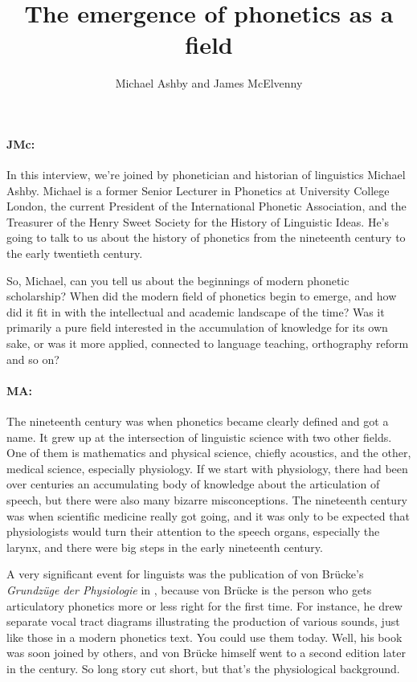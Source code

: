 \documentclass[output=paper]{langscibook}
\author{Michael Ashby\orcid{}\affiliation{University College London} and James McElvenny\affiliation{University of Siegen}}
\title{The emergence of phonetics as a field}
\begin{document}
\maketitle 

\paragraph*{JMc:} In this interview, we’re joined by phonetician and historian of linguistics Michael Ashby. Michael is a former Senior Lecturer in Phonetics at University College London, the current President of the International Phonetic Association, and the Treasurer of the Henry Sweet Society for the History of Linguistic Ideas. He’s going to talk to us about the history of phonetics from the nineteenth century to the early twentieth century.

So, Michael, can you tell us about the beginnings of modern phonetic scholarship? When did the modern field of phonetics begin to emerge, and how did it fit in with the intellectual and academic landscape of the time? Was it primarily a pure field interested in the accumulation of knowledge for its own sake, or was it more applied, connected to language teaching, orthography reform and so on?

\paragraph*{MA:} The nineteenth century was when phonetics became clearly defined and got a name. It grew up at the intersection of linguistic science with two other fields. One of them is mathematics and physical science, chiefly acoustics, and the other, medical science, especially physiology. If we start with physiology, there had been over centuries an accumulating body of knowledge about the articulation of speech, but there were also many bizarre misconceptions. The nineteenth century was when scientific medicine really got going, and it was only to be expected that physiologists would turn their attention to the speech organs, especially the larynx, and there were big steps in the early nineteenth century.

A very significant event for linguists was the publication of von Brücke’s \textit{Grundzüge der Physiologie} in \citeyear{bruecke1856a}, because von Brücke is the person who gets articulatory phonetics more or less right for the first time. For instance, he drew separate vocal tract diagrams illustrating the production of various sounds, just like those in a modern phonetics text. You could use them today. Well, his book was soon joined by others, and von Brücke himself went to a second edition later in the century. So long story cut short, but that’s the physiological background. 
\end{document}
